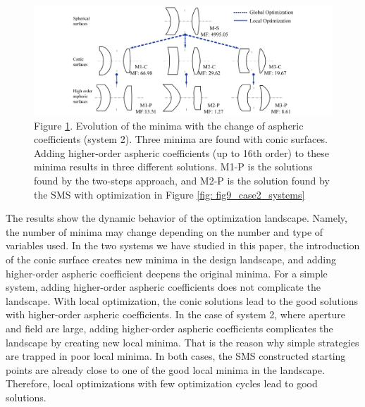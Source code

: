 \begin{figure}[h!]
    \centering
    \includegraphics[width=1\textwidth]{chapter-5/figures/Fig13_OE340147.png}
    \caption{Figure \ref{fig: fig13_case2_optStruc}. Evolution of the minima with the change of aspheric coefficients (system 2). Three minima are found with conic surfaces. Adding higher-order aspheric coefficients (up to 16th order) to these minima results in three different solutions. M1-P is the solutions found by the two-steps approach, and M2-P is the solution found by the SMS with optimization in Figure \ref{fig: fig9_case2_systems}}
    \label{fig: fig13_case2_optStruc}
\end{figure}

The results show the dynamic behavior of the optimization landscape. Namely, the number of minima may change depending on the number and type of variables used. In the two systems we have studied in this paper, the introduction of the conic surface creates new minima in the design landscape, and adding higher-order aspheric coefficient deepens the original minima. For a simple system, adding higher-order aspheric coefficients does not complicate the landscape. With local optimization, the conic solutions lead to the good solutions with higher-order aspheric coefficients. In the case of system 2, where aperture and field are large, adding higher-order aspheric coefficients complicates the landscape by creating new local minima. That is the reason why simple strategies are trapped in poor local minima. In both cases, the SMS constructed starting points are already close to one of the good local minima in the landscape. Therefore, local optimizations with few optimization cycles lead to good solutions.

